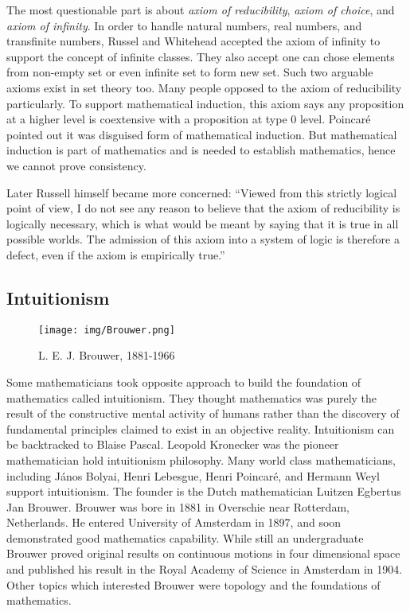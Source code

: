 \documentclass[b5paper]{article}
\begin{document}
The most questionable part is about {\em axiom of reducibility}, {\em axiom of choice}, and {\em axiom of infinity}. In order to handle natural numbers, real numbers, and transfinite numbers, Russel and Whitehead accepted the axiom of infinity to support the concept of infinite classes. They also accept one can chose elements from non-empty set or even infinite set to form new set. Such two arguable axioms exist in set theory too. Many people opposed to the axiom of reducibility particularly. To support mathematical induction, this axiom says any proposition at a higher level is coextensive with a proposition at type 0 level. Poincaré pointed out it was disguised form of mathematical induction. But mathematical induction is part of mathematics and is needed to establish mathematics, hence we cannot prove consistency.

Later Russell himself became more concerned: ``Viewed from this strictly logical point of view, I do not see any reason to believe that the axiom of reducibility is logically necessary, which is what would be meant by saying that it is true in all possible worlds. The admission of this axiom into a system of logic is therefore a defect, even if the axiom is empirically true.''\cite{M-Kline-2007}

\subsection{Intuitionism}

\begin{wrapfigure}{L}{0.4\textwidth}
 \centering
 \texttt{[image: img/Brouwer.png]}
 \captionsetup{labelformat=empty}
 \caption{L. E. J. Brouwer, 1881-1966}
 \label{fig:Brouwer}
\end{wrapfigure}

Some mathematicians took opposite approach to build the foundation of mathematics called intuitionism. They thought mathematics was purely the result of the constructive mental activity of humans rather than the discovery of fundamental principles claimed to exist in an objective reality. Intuitionism can be backtracked to Blaise Pascal. Leopold Kronecker was the pioneer mathematician hold intuitionism philosophy. Many world class mathematicians, including János Bolyai, Henri Lebesgue, Henri Poincaré, and Hermann Weyl support intuitionism. The founder is the Dutch mathematician Luitzen Egbertus Jan Brouwer. Brouwer was bore in 1881 in Overschie near Rotterdam, Netherlands. He entered University of Amsterdam in 1897, and soon demonstrated good mathematics capability. While still an undergraduate Brouwer proved original results on continuous motions in four dimensional space and published his result in the Royal Academy of Science in Amsterdam in 1904. Other topics which interested Brouwer were topology and the foundations of mathematics.
\end{document}
